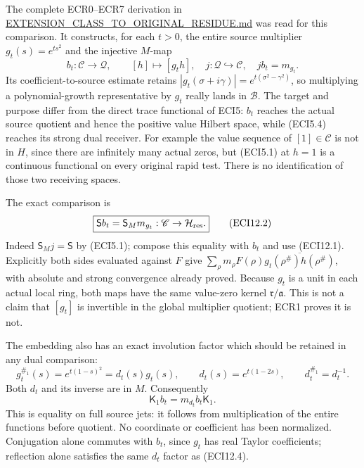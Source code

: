 The complete ECR0--ECR7 derivation in
\href{https://github.com/KokunoYumeto/zeta-function-research-reader/blob/main/workbenches/splitzero-tandem/continuations/20260925-full-source-tensor-and-original-divisor/gct/EXTENSION_CLASS_TO_ORIGINAL_RESIDUE.md}{EXTENSION\_CLASS\_TO\_ORIGINAL\_RESIDUE.md}
was read for this comparison. It constructs, for each \(t>0\), the
entire source multiplier \(g_t(s)=e^{ts^2}\) and the injective \(M\)-map
\[
b_t:\mathscr C\to\mathcal Q,\qquad[h]\mapsto[g_t h],
\quad j:\mathcal Q\hookrightarrow\mathscr C,
\quad jb_t=m_{g_t}.
\tag{ECI12.1}
\] Its coefficient-to-source estimate retains
\(|g_t(\sigma+i\gamma)|=e^{t(\sigma^2-\gamma^2)}\), so multiplying a
polynomial-growth representative by \(g_t\) really lands in
\(\mathcal B\). The target and purpose differ from the direct trace
functional of ECI5: \(b_t\) reaches the actual source quotient and hence
the positive value Hilbert space, while (ECI5.4) reaches its strong dual
receiver. For example the value sequence of \([1]\in\mathscr C\) is not
in \(H\), since there are infinitely many actual zeros, but (ECI5.1) at
\(h=1\) is a continuous functional on every original rapid test. There
is no identification of those two receiving spaces.

The exact comparison is \[
\boxed{\mathsf S b_t=\mathsf S_M m_{g_t}:\mathscr C\to\mathcal H_{\rm res}.}
\tag{ECI12.2}
\] Indeed \(\mathsf S_Mj=\mathsf S\) by (ECI5.1); compose this equality
with \(b_t\) and use (ECI12.1). Explicitly both sides evaluated against
\(F\) give
\(\sum_\rho m_\rho F(\rho)\overline{g_t(\rho^\#)h(\rho^\#)}\), with
absolute and strong convergence already proved. Because \(g_t\) is a
unit in each actual local ring, both maps have the same value-zero
kernel \(\mathfrak r/\mathfrak a\). This is not a claim that \([g_t]\)
is invertible in the global multiplier quotient; ECR1 proves it is not.

The embedding also has an exact involution factor which should be
retained in any dual comparison: \[
g_t^{\#_1}(s)=e^{t(1-s)^2}=d_t(s)g_t(s),
\qquad d_t(s)=e^{t(1-2s)},
\qquad d_t^{\#_1}=d_t^{-1}.
\tag{ECI12.3}
\] Both \(d_t\) and its inverse are in \(M\). Consequently \[
\mathsf K_1 b_t=m_{d_t}b_t\mathsf K_1.
\tag{ECI12.4}
\] This is equality on full source jets: it follows from multiplication
of the entire functions before quotient. No coordinate or coefficient
has been normalized. Conjugation alone commutes with \(b_t\), since
\(g_t\) has real Taylor coefficients; reflection alone satisfies the
same \(d_t\) factor as (ECI12.4).

